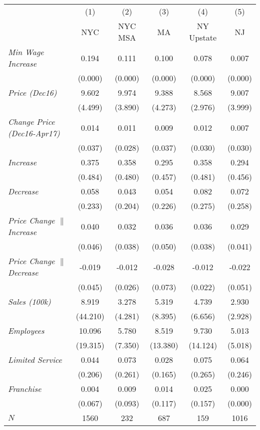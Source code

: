 \begin{center}
\begin{tabular}{lccccc}
\hline  & (1) & (2) & (3) & (4) & (5)\\
 & NYC & NYC MSA & MA & NY Upstate & NJ\\
\hline  \textit{Min Wage Increase}  & 0.194 & 0.111 & 0.100 & 0.078 & 0.007\\
  & (0.000) & (0.000) & (0.000) & (0.000) & (0.000)\\
 \textit{Price (Dec16)}  & 9.602 & 9.974 & 9.388 & 8.568 & 9.007\\
  & (4.499) & (3.890) & (4.273) & (2.976) & (3.999)\\
 \textit{Change Price (Dec16-Apr17)}  & 0.014 & 0.011 & 0.009 & 0.012 & 0.007\\
  & (0.037) & (0.028) & (0.037) & (0.030) & (0.030)\\
 \textit{Increase}  & 0.375 & 0.358 & 0.295 & 0.358 & 0.294\\
  & (0.484) & (0.480) & (0.457) & (0.481) & (0.456)\\
 \textit{Decrease}  & 0.058 & 0.043 & 0.054 & 0.082 & 0.072\\
  & (0.233) & (0.204) & (0.226) & (0.275) & (0.258)\\
 \textit{Price Change $\|$ Increase}  & 0.040 & 0.032 & 0.036 & 0.036 & 0.029\\
  & (0.046) & (0.038) & (0.050) & (0.038) & (0.041)\\
 \textit{Price Change $\|$ Decrease}  & -0.019 & -0.012 & -0.028 & -0.012 & -0.022\\
  & (0.045) & (0.026) & (0.073) & (0.022) & (0.051)\\
 \textit{Sales (100k)}  & 8.919 & 3.278 & 5.319 & 4.739 & 2.930\\
  & (44.210) & (4.281) & (8.395) & (6.656) & (2.928)\\
 \textit{Employees} & 10.096 & 5.780 & 8.519 & 9.730 & 5.013\\
  & (19.315) & (7.350) & (13.380) & (14.124) & (5.018)\\
 \textit{Limited Service}  & 0.044 & 0.073 & 0.028 & 0.075 & 0.064\\
  & (0.206) & (0.261) & (0.165) & (0.265) & (0.246)\\
 \textit{Franchise}  & 0.004 & 0.009 & 0.014 & 0.025 & 0.000\\
  & (0.067) & (0.093) & (0.117) & (0.157) & (0.000)\\
\hline  $ N $  & 1560 & 232 & 687 & 159 & 1016\\
\hline\end{tabular}\\
\end{center}
